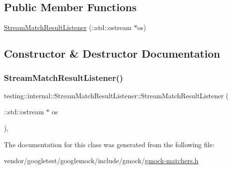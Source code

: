 \subsection*{Public Member Functions}
\begin{DoxyCompactItemize}
\item 
\hyperlink{classtesting_1_1internal_1_1_stream_match_result_listener_a81985760741d818745237df002d65d04}{Stream\+Match\+Result\+Listener} (\+::std\+::ostream $\ast$os)
\end{DoxyCompactItemize}


\subsection{Constructor \& Destructor Documentation}
\mbox{\label{classtesting_1_1internal_1_1_stream_match_result_listener_a81985760741d818745237df002d65d04}} 
\subsubsection{\texorpdfstring{Stream\+Match\+Result\+Listener()}{StreamMatchResultListener()}}
{\footnotesize\ttfamily testing\+::internal\+::\+Stream\+Match\+Result\+Listener\+::\+Stream\+Match\+Result\+Listener (\begin{DoxyParamCaption}\item[{\+::std\+::ostream $\ast$}]{os }\end{DoxyParamCaption})\hspace{0.3cm}{\ttfamily [inline]}, {\ttfamily [explicit]}}



The documentation for this class was generated from the following file\+:\begin{DoxyCompactItemize}
\item 
vendor/googletest/googlemock/include/gmock/\hyperlink{gmock-matchers_8h}{gmock-\/matchers.\+h}\end{DoxyCompactItemize}
